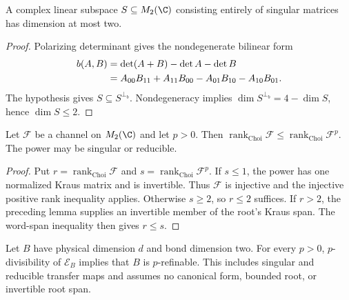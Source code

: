 \begin{lemma}
    \label{lem:periodic_qubit_singular_span_dimension}
    \leanok
    A complex linear subspace $S\subseteq M_2(\C)$ consisting entirely
    of singular matrices has dimension at most two.
\end{lemma}

\begin{proof}\leanok
    Polarizing determinant gives the nondegenerate bilinear form
    \begin{align}
        b(A,B) & =\det(A+B)-\det A-\det B\notag                        \\
               & =A_{00}B_{11}+A_{11}B_{00}-A_{01}B_{10}-A_{10}B_{01}.
        \notag
    \end{align}
    The hypothesis gives $S\subseteq S^{\perp_b}$. Nondegeneracy implies
    $\dim S^{\perp_b}=4-\dim S$, hence $\dim S\le2$.
\end{proof}

\begin{lemma}
    \label{lem:periodic_qubit_root_rank}
    \leanok
    Let $\mathcal F$ be a channel on $M_2(\C)$ and let $p>0$. Then
    $\operatorname{rank}_{\mathrm{Choi}}\mathcal F\le
        \operatorname{rank}_{\mathrm{Choi}}\mathcal F^p$.
    The power may be singular or reducible.
\end{lemma}

\begin{proof}\leanok
    Put $r=\operatorname{rank}_{\mathrm{Choi}}\mathcal F$ and
    $s=\operatorname{rank}_{\mathrm{Choi}}\mathcal F^p$.
    If $s\le1$, the power has one normalized Kraus matrix and is
    invertible. Thus $\mathcal F$ is injective and the injective positive
    rank inequality applies. Otherwise $s\ge2$, so $r\le2$ suffices.
    If $r>2$, the preceding lemma supplies an invertible member of the
    root's Kraus span. The word-span inequality then gives $r\le s$.
\end{proof}

\begin{lemma}
    \label{lem:periodic_qubit_refinement}
    \leanok
    Let $B$ have physical dimension $d$ and bond dimension two. For every $p>0$,
    $p$-divisibility of $\mathcal E_B$ implies that $B$ is $p$-refinable.
    This includes singular and reducible transfer maps and assumes no
    canonical form, bounded root, or invertible root span.
\end{lemma}

